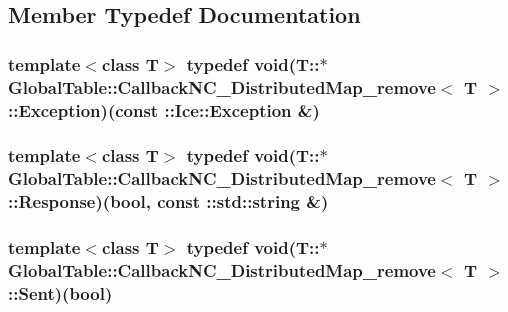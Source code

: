\subsection{Member Typedef Documentation}
\hypertarget{class_global_table_1_1_callback_n_c___distributed_map__remove_a6af61b5cc432f624acfd6a7cbf2ace31}{
\subsubsection[{Exception}]{\setlength{\rightskip}{0pt plus 5cm}template$<$class T$>$ typedef void(T::$\ast$ {\bf GlobalTable::CallbackNC\_\-DistributedMap\_\-remove}$<$ T $>$::{\bf Exception})(const ::Ice::Exception \&)}}
\label{class_global_table_1_1_callback_n_c___distributed_map__remove_a6af61b5cc432f624acfd6a7cbf2ace31}
\hypertarget{class_global_table_1_1_callback_n_c___distributed_map__remove_a7a067fa8583ce4e7507e4c0601f9800d}{
\subsubsection[{Response}]{\setlength{\rightskip}{0pt plus 5cm}template$<$class T$>$ typedef void(T::$\ast$ {\bf GlobalTable::CallbackNC\_\-DistributedMap\_\-remove}$<$ T $>$::{\bf Response})(bool, const ::std::string \&)}}
\label{class_global_table_1_1_callback_n_c___distributed_map__remove_a7a067fa8583ce4e7507e4c0601f9800d}
\hypertarget{class_global_table_1_1_callback_n_c___distributed_map__remove_afd84ad88b313577ef250caab113b43a3}{
\subsubsection[{Sent}]{\setlength{\rightskip}{0pt plus 5cm}template$<$class T$>$ typedef void(T::$\ast$ {\bf GlobalTable::CallbackNC\_\-DistributedMap\_\-remove}$<$ T $>$::{\bf Sent})(bool)}}
